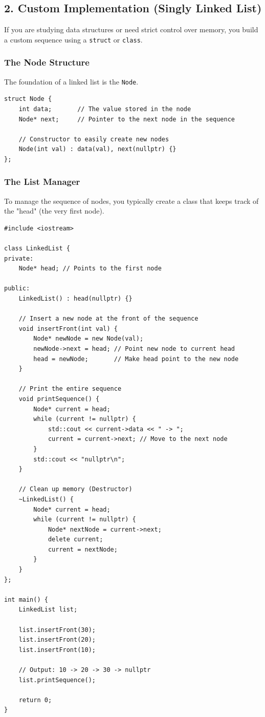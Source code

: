 \documentclass{article}
\begin{document}
\subsection{2. Custom Implementation (Singly Linked List)}

If you are studying data structures or need strict control over memory, you build a custom sequence using a \texttt{struct} or \texttt{class}.

\subsubsection{The Node Structure}
The foundation of a linked list is the \texttt{Node}.

\begin{lstlisting}
struct Node {
    int data;       // The value stored in the node
    Node* next;     // Pointer to the next node in the sequence

    // Constructor to easily create new nodes
    Node(int val) : data(val), next(nullptr) {}
};
\end{lstlisting}

\subsubsection{The List Manager}
To manage the sequence of nodes, you typically create a class that keeps track of the "head" (the very first node).

\begin{lstlisting}
#include <iostream>

class LinkedList {
private:
    Node* head; // Points to the first node

public:
    LinkedList() : head(nullptr) {}

    // Insert a new node at the front of the sequence
    void insertFront(int val) {
        Node* newNode = new Node(val);
        newNode->next = head; // Point new node to current head
        head = newNode;       // Make head point to the new node
    }

    // Print the entire sequence
    void printSequence() {
        Node* current = head;
        while (current != nullptr) {
            std::cout << current->data << " -> ";
            current = current->next; // Move to the next node
        }
        std::cout << "nullptr\n";
    }
    
    // Clean up memory (Destructor)
    ~LinkedList() {
        Node* current = head;
        while (current != nullptr) {
            Node* nextNode = current->next;
            delete current;
            current = nextNode;
        }
    }
};

int main() {
    LinkedList list;
    
    list.insertFront(30);
    list.insertFront(20);
    list.insertFront(10);
    
    // Output: 10 -> 20 -> 30 -> nullptr
    list.printSequence(); 
    
    return 0;
}
\end{lstlisting}
\end{document}
